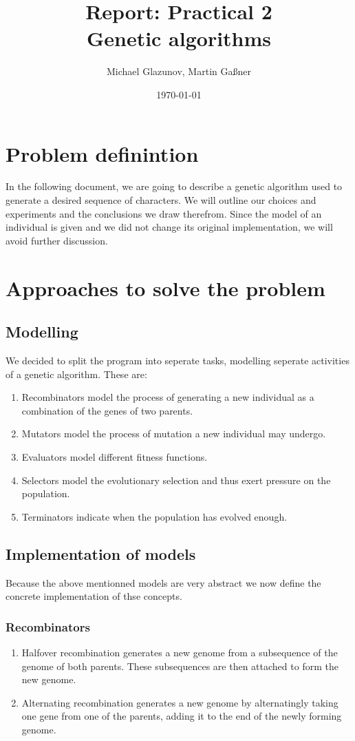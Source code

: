 \documentclass[a4paper,10pt]{article}
\title{Report: Practical 2 \\ Genetic algorithms}
\author{Michael Glazunov, Martin Gaßner}
\date{\today}
\begin{document}
\maketitle

\newpage
{}

\section{Problem definintion}
In the following document, we are going to describe a genetic algorithm used to generate a desired sequence of characters. We will outline our choices and experiments and the conclusions we draw therefrom.\newline
Since the model of an individual is given and we did not change its original implementation, we will avoid further discussion.

\section{Approaches to solve the problem}
\subsection{Modelling}
We decided to split the program into seperate tasks, modelling seperate activities of a genetic algorithm. These are:
\begin{enumerate}
 \item Recombinators model the process of generating a new individual as a combination of the genes of two parents.
 \item Mutators model the process of mutation a new individual may undergo.
 \item Evaluators model different fitness functions.
 \item Selectors model the evolutionary selection and thus exert pressure on the population.
 \item Terminators indicate when the population has evolved enough.
\end{enumerate}
\subsection{Implementation of models}
Because the above mentionned models are very abstract we now define the concrete implementation of thse concepts.

\subsubsection{Recombinators}
\begin{enumerate}
 \item Halfover recombination generates a new genome from a subsequence of the genome of both parents. These subsequences are then attached to form the new genome.
 \item Alternating recombination generates a new genome by alternatingly taking one gene from one of the parents, adding it to the end of the newly forming genome.
\end{enumerate}
\end{document}
